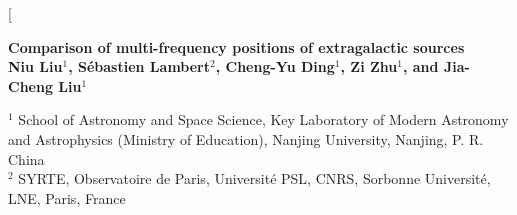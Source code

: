 \documentclass{aa-note}   %
\begin{document}
  


\twocolumn[{%
\vspace*{4ex}
\begin{center}
   {\Large \bf Comparison of multi-frequency positions of extragalactic sources}\\[4ex] 
  {\large \bf 
              Niu Liu$^{1}$, 
              S\'ebastien Lambert$^2$,
              Cheng-Yu Ding$^1$,
              Zi Zhu$^1$,
              and 
              Jia-Cheng Liu$^1$
          }\\[4ex]
  \begin{minipage}[t]{15cm}
        $^1$ School of Astronomy and Space Science,
   		     Key Laboratory of Modern Astronomy and Astrophysics (Ministry of Education), 
		     Nanjing University, Nanjing, P. R. China\\
        $^2$ SYRTE, Observatoire de Paris,
             Universit\'e PSL, CNRS, Sorbonne Universit\'e, LNE, Paris, France\\


\end{minipage}
\end{center}}
\end{document}
